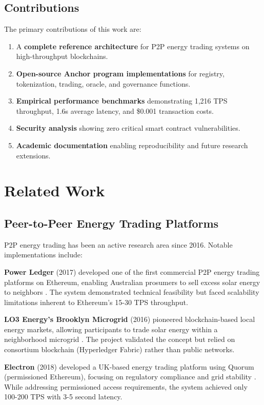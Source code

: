 \documentclass[conference]{IEEEtran}
\begin{document}
\subsection{Contributions}

The primary contributions of this work are:

\begin{enumerate}
    \item A \textbf{complete reference architecture} for P2P energy trading systems on high-throughput blockchains.
    \item \textbf{Open-source Anchor program implementations} for registry, tokenization, trading, oracle, and governance functions.
    \item \textbf{Empirical performance benchmarks} demonstrating 1,216 TPS throughput, 1.6s average latency, and \$0.001 transaction costs.
    \item \textbf{Security analysis} showing zero critical smart contract vulnerabilities.
    \item \textbf{Academic documentation} enabling reproducibility and future research extensions.
\end{enumerate}

\section{Related Work}

\subsection{Peer-to-Peer Energy Trading Platforms}

P2P energy trading has been an active research area since 2016. Notable implementations include:

\textbf{Power Ledger} (2017) developed one of the first commercial P2P energy trading platforms on Ethereum, enabling Australian prosumers to sell excess solar energy to neighbors \cite{powerledger2017}. The system demonstrated technical feasibility but faced scalability limitations inherent to Ethereum's 15-30 TPS throughput.

\textbf{LO3 Energy's Brooklyn Microgrid} (2016) pioneered blockchain-based local energy markets, allowing participants to trade solar energy within a neighborhood microgrid \cite{lo3energy2016}. The project validated the concept but relied on consortium blockchain (Hyperledger Fabric) rather than public networks.

\textbf{Electron} (2018) developed a UK-based energy trading platform using Quorum (permissioned Ethereum), focusing on regulatory compliance and grid stability \cite{electron2018}. While addressing permissioned access requirements, the system achieved only 100-200 TPS with 3-5 second latency.
\end{document}
